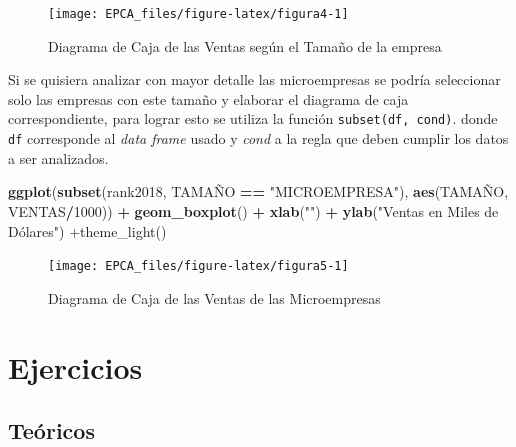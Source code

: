 \documentclass[
]{krantz}
\makeatletter
\newenvironment{Shaded}{\begin{snugshade}}{\end{snugshade}}
\newcommand{\DecValTok}[1]{\textcolor[rgb]{0.06,0.06,0.06}{#1}}
\newcommand{\KeywordTok}[1]{\textcolor[rgb]{0.27,0.27,0.27}{\textbf{#1}}}
\newcommand{\NormalTok}[1]{#1}
\newcommand{\OperatorTok}[1]{\textcolor[rgb]{0.43,0.43,0.43}{\textbf{#1}}}
\newcommand{\StringTok}[1]{\textcolor[rgb]{0.5,0.5,0.5}{#1}}
\newenvironment{kframe}{%
\medskip{}
\setlength{\fboxsep}{.8em}
 \def\at@end@of@kframe{}%
 \ifinner\ifhmode%
  \def\at@end@of@kframe{\end{minipage}}%
  \begin{minipage}{\columnwidth}%
 \fi\fi%
 \def\FrameCommand##1{\hskip\@totalleftmargin \hskip-\fboxsep
 \colorbox{shadecolor}{##1}\hskip-\fboxsep
     \hskip-\linewidth \hskip-\@totalleftmargin \hskip\columnwidth}%
 \MakeFramed {\advance\hsize-\width
   \@totalleftmargin\z@ \linewidth\hsize
   \@setminipage}}%
 {\par\unskip\endMakeFramed%
 \at@end@of@kframe}
\renewenvironment{Shaded}{\begin{kframe}}{\end{kframe}}
\makeatother
\begin{document}
\begin{figure}[h!]

{\centering \texttt{[image: EPCA\_files/figure-latex/figura4-1]} 

}

\caption{Diagrama de Caja de las Ventas según el Tamaño de la empresa}\label{fig:figura4}
\end{figure}

Si se quisiera analizar con mayor detalle las microempresas se podría seleccionar solo las empresas con este tamaño y elaborar el diagrama de caja correspondiente, para lograr esto se utiliza la función \texttt{subset(df,\ cond)}. donde \texttt{df} corresponde al \emph{data frame} usado y \emph{cond} a la regla que deben cumplir los datos a ser analizados.

\begin{Shaded}
\begin{Highlighting}[]
\KeywordTok{ggplot}\NormalTok{(}\KeywordTok{subset}\NormalTok{(rank2018, TAMAÑO }\OperatorTok{==}\StringTok{ "MICROEMPRESA"}\NormalTok{), }\KeywordTok{aes}\NormalTok{(TAMAÑO, VENTAS}\OperatorTok{/}\DecValTok{1000}\NormalTok{)) }\OperatorTok{+}\StringTok{ }
\StringTok{  }\KeywordTok{geom_boxplot}\NormalTok{() }\OperatorTok{+}\StringTok{ }\KeywordTok{xlab}\NormalTok{(}\StringTok{""}\NormalTok{) }\OperatorTok{+}
\StringTok{  }\KeywordTok{ylab}\NormalTok{(}\StringTok{"Ventas en Miles de Dólares") +theme_light()}
\end{Highlighting}
\end{Shaded}

\begin{figure}[h!]

{\centering \texttt{[image: EPCA\_files/figure-latex/figura5-1]} 

}

\caption{Diagrama de Caja de las Ventas de las Microempresas}\label{fig:figura5}
\end{figure}

\newpage

\hypertarget{ejercicios}{%
\section{Ejercicios}\label{ejercicios}}

\hypertarget{teoricos}{%
\subsection{Teóricos}\label{teoricos}}
\end{document}
